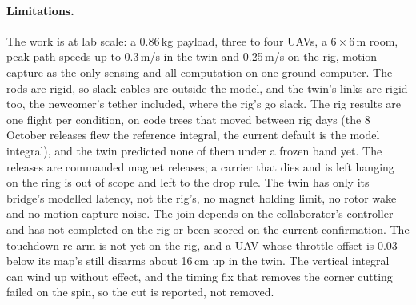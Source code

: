 \paragraph{Limitations.} The work is at lab scale: a 0.86\,kg payload, three to four UAVs, a 6\,$\times$\,6\,m room,
peak path speeds up to 0.3\,m/s in the twin and 0.25\,m/s on the rig, motion capture as the only sensing and all
computation on one ground computer. The rods are rigid, so slack cables are outside the model, and the twin's links
are rigid too, the newcomer's tether included, where the rig's go slack. The rig results are one flight per condition,
on code trees that moved between rig days (the 8 October releases flew the reference integral, the current default is
the model integral), and the twin predicted none of them under a frozen band yet. The releases are commanded magnet
releases; a carrier that dies and is left hanging on the ring is out of scope and left to the drop rule. The twin has only its bridge's modelled latency, not the
rig's, no magnet holding limit, no rotor wake and no motion-capture noise. The join depends on the collaborator's
controller and has not completed on the rig or been scored on the current confirmation. The touchdown re-arm is not yet
on the rig, and a UAV whose throttle offset is 0.03 below its map's still disarms about 16\,cm up in the twin. The vertical integral
can wind up without effect, and the timing fix that removes the corner cutting failed on the spin, so the cut is
reported, not removed.
